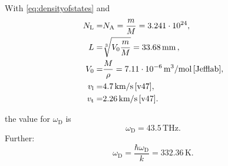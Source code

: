With \eqref{eq:densityofstates} and
\begin{align*}
    N_\text{L} =& N_\text{A} = \dfrac{m}{M} =  3.241 \cdot 10^{24},                                 \\
    L          =& \sqrt[3]{V_0 \dfrac{m}{M} } = 33.68 \, \text{mm} \, ,              \\
    V_0        =& \dfrac{M}{\rho} = 7.11 \cdot 10^{-6} \, \text{m}^3/\text{mol} \, \text{\cite{Jefflab}},  \\
    v_\text{l}        =& 4.7 \, \text{km/s} \,                                             \text{\cite{v47}},                            \\
    v_\text{t}        =& 2.26 \, \text{km/s} \,                                            \text{\cite{v47}}.
\end{align*}


the value for $\omega_\text{D}$ is 
\begin{equation*}
    \omega_\text{D} = 43.5 \, \unit{\tera\hertz}.
    \label{eq:debye_freq}
\end{equation*}
Further:
\begin{equation*}
    \omega_\text{D} = \dfrac{\hbar \omega_\text{D}}{k} = 332.36 \, \unit{\kelvin}.
\end{equation*}

